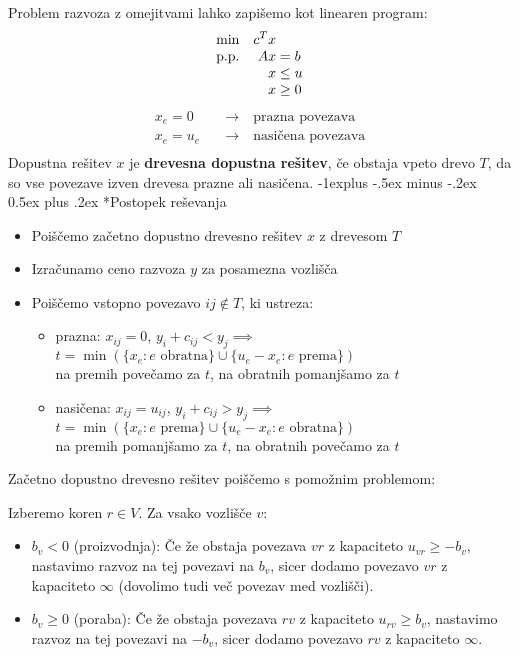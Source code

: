 \documentclass[a4paper,8pt]{extarticle}
\makeatletter
\renewcommand{\subsection}{\@startsection{subsection}{2}{0mm}%
                                {-1explus -.5ex minus -.2ex}%
                                {0.5ex plus .2ex}%
                                {\normalfont\normalsize\bfseries}}
\makeatother
\begin{document}
\begin{multicols}{4}
Problem razvoza z omejitvami lahko zapišemo kot linearen program:
\begin{align*}
	\begin{array}{l >{\displaystyle}r@{\;} l}
		\min 		& c^T x	\\		
		\text{p.p.} & Ax	& = b	 \\
					& x 	 						&\leq u	\\
					& x 	 						&\geq 0	
	\end{array}
\end{align*}
\begin{align*}
	x_e = 0 	\quad & \rightarrow \quad \text{prazna povezava} \\
	x_e = u_e 	\quad & \rightarrow \quad \text{nasičena povezava} \\
\end{align*}
Dopustna rešitev $x$ je \textbf{drevesna dopustna rešitev}, če obstaja vpeto drevo $T$, da so vse povezave izven drevesa prazne ali nasičena. 
\subsection*{Postopek reševanja}
\begin{itemize}
	\item Poiščemo začetno dopustno drevesno rešitev $x$ z drevesom $T$
	\item Izračunamo ceno razvoza $y$ za posamezna vozlišča
	\item Poiščemo vstopno povezavo $ij \notin T$, ki ustreza:
	\begin{itemize}
		\item prazna: $x_{ij} = 0$, $y_i + c_{ij} < y_j \implies $ \\
		$ t = \min \left( \{x_e : e \text{ obratna}\} \cup \{u_e-x_e : e \text{ prema}\}\right)$ \\
		na premih povečamo za $t$, na obratnih pomanjšamo za $t$
		\item nasičena: $x_{ij} = u_{ij}$, $y_i + c_{ij} > y_j \implies $ \\
		$ t = \min \left( \{x_e : e \text{ prema}\} \cup \{u_e-x_e : e \text{ obratna}\}\right)$ \\
		na premih pomanjšamo za $t$, na obratnih povečamo za $t$
	\end{itemize}
\end{itemize}

Začetno dopustno drevesno rešitev poiščemo s pomožnim problemom:

Izberemo koren $r \in V$. Za vsako vozlišče $v$:
\begin{itemize}
	\item $b_v < 0$ (proizvodnja): Če že obstaja povezava $vr$ z kapaciteto $u_{vr} \geq -b_v$, nastavimo razvoz na tej povezavi na $b_v$, sicer dodamo povezavo $vr$ z kapaciteto $\infty$ (dovolimo tudi več povezav med vozlišči).
	\item $b_v \geq 0$ (poraba): Če že obstaja povezava $rv$ z kapaciteto $u_{rv} \geq b_v$, nastavimo razvoz na tej povezavi na $-b_v$, sicer dodamo povezavo $rv$ z kapaciteto $\infty$.
\end{itemize}


\end{multicols}
\end{document}
